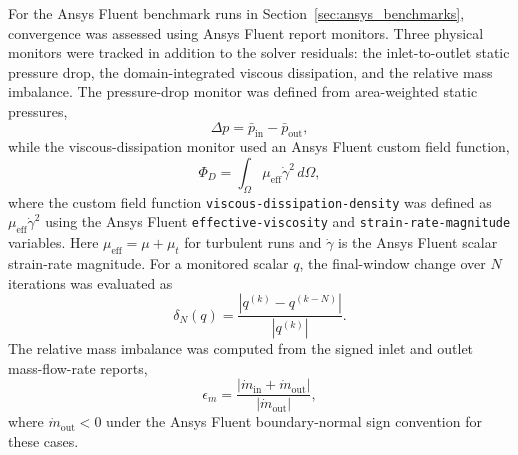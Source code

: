 For the Ansys Fluent benchmark runs in Section~\ref{sec:ansys_benchmarks}, convergence was assessed using Ansys Fluent report monitors. Three physical monitors were tracked in addition to the solver residuals: the inlet-to-outlet static pressure drop, the domain-integrated viscous dissipation, and the relative mass imbalance. The pressure-drop monitor was defined from area-weighted static pressures,
\begin{equation}
	\Delta p = \bar{p}_{\mathrm{in}} - \bar{p}_{\mathrm{out}},
	\label{eq:ch2_fluent_pressure_drop_monitor}
\end{equation}
while the viscous-dissipation monitor used an Ansys Fluent custom field function,
\begin{equation}
	\Phi_D = \int_{\Omega} \mu_{\mathrm{eff}}\dot{\gamma}^{2} \, d\Omega ,
	\label{eq:ch2_fluent_viscous_dissipation_monitor}
\end{equation}
where the custom field function \texttt{viscous-dissipation-density} was defined as $\mu_{\mathrm{eff}}\dot{\gamma}^{2}$ using the Ansys Fluent \texttt{effective-viscosity} and \texttt{strain-rate-magnitude} variables. Here $\mu_{\mathrm{eff}}=\mu+\mu_t$ for turbulent runs and $\dot{\gamma}$ is the Ansys Fluent scalar strain-rate magnitude. For a monitored scalar $q$, the final-window change over $N$ iterations was evaluated as
\begin{equation}
	\delta_N(q) =
	\frac{\left|q^{(k)} - q^{(k-N)}\right|}
	{\left|q^{(k)}\right|} .
	\label{eq:ch2_fluent_monitor_window_change}
\end{equation}
The relative mass imbalance was computed from the signed inlet and outlet mass-flow-rate reports,
\begin{equation}
	\epsilon_m =
	\frac{\left|\dot{m}_{\mathrm{in}} + \dot{m}_{\mathrm{out}}\right|}
	{\left|\dot{m}_{\mathrm{out}}\right|},
	\label{eq:ch2_fluent_mass_imbalance}
\end{equation}
where $\dot{m}_{\mathrm{out}}<0$ under the Ansys Fluent boundary-normal sign convention for these cases.

